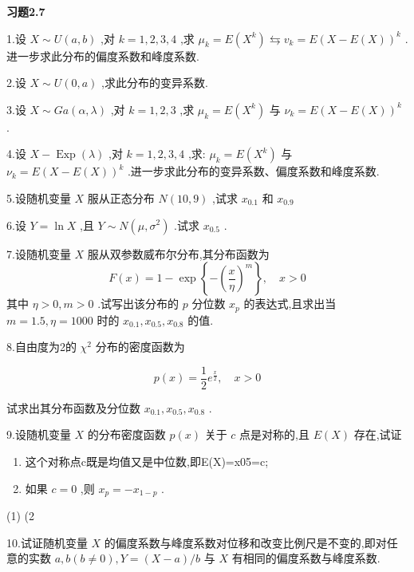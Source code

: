 \begin{center}
	\textbf{习题2.7}
\end{center}

1.设 $ X \sim U(a, b) $ ,对 $ k=1,2,3,4 $ ,求 $ \mu_{k}=E\left(X^{k}\right) \leftrightarrows v_{k}=E(X-E(X))^{k} $ .进一步求此分布的偏度系数和峰度系数.

2.设 $ X \sim U(0, a) $ ,求此分布的变异系数.

3.设 $ X \sim G a(\alpha, \lambda) $ ,对 $ k=1,2,3 $ ,求 $ \mu_{k}=E\left(X^{k}\right) $ 与 $ \nu_{k}=E(X-E(X))^{k} $ .

4.设 $ X-\operatorname{Exp}(\lambda) $ ,对 $ k=1,2,3,4 $ ,求: $ \mu_{k}=E\left(X^{k}\right) $ 与 $ \nu_{k}=E(X-E(X))^{k} $ .进一步求此分布的变异系数、偏度系数和峰度系数.

5.设随机变量 $ X $ 服从正态分布 $ N(10,9) $ ,试求 $ x_{0.1} $ 和 $ x_{0.9} $ 

6.设 $ Y=\ln X $ ,且 $ Y \sim N\left(\mu, \sigma^{2}\right) $ .试求 $ x_{0.5} $ .

7.设随机变量 $ X $ 服从双参数威布尔分布,其分布函数为
\[
F(x)=1-\exp \left\{-\left(\frac{x}{\eta}\right)^{m}\right\}, \quad x>0
\]
其中 $ \eta>0, m>0 $ .试写出该分布的 $ p $ 分位数 $ x_{p} $ 的表达式,且求出当 $ m=1.5, \eta=1000 $ 时的 $ x_{0.1}, x_{0.5}, x_{0.8} $ 的值.

8.自由度为2的 $ \chi^{2} $ 分布的密度函数为

\[
p(x)=\frac{1}{2} e^{\frac{x}{2}}, \quad x>0
\]

试求出其分布函数及分位数 $ x_{0.1}, x_{0.5}, x_{0.8} $ .

9.设随机变量 $ X $ 的分布密度函数 $ p(x) $ 关于 $ c $ 点是对称的,且 $ E(X) $ 存在,试证

\begin{enumerate}
	\item 这个对称点c既是均值又是中位数,即E(X)=x05=c;
	\item 如果 $ c=0 $ ,则 $ x_{p}=-x_{1-p} $ .
\end{enumerate}(1)
(2

10.试证随机变量 $ X $ 的偏度系数与峰度系数对位移和改变比例尺是不变的,即对任意的实数 $ a, b(b \neq 0), Y=(X-a) / b $ 与 $ X $ 有相同的偏度系数与峰度系数.

